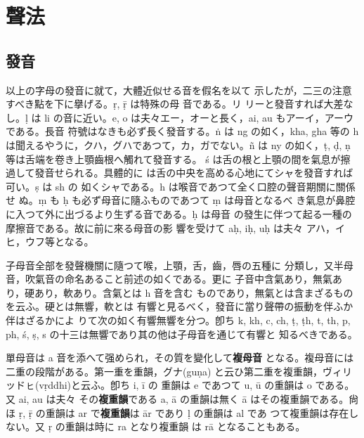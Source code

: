 \chapter{聲法}
\label{cha:pronunciation}

\section{發音}
\numberParagraph
以上の字母の發音に就て，大體近似せる音を假名を以て
示したが，二三の注意すべき點を下に擧げる。ṛ, ṝ は特殊の母
音である。リ リーと發音すれば大差なし。ḷ は li の音に近い。e,
o は夫々エー，オーと長く，ai, au もアーイ，アーウである。長音
符號はなきも必ず長く發音する。ṅ は ng の如く，kha, gha
等の h は聞えるやうに，クハ，グハであつて，カ，ガでない。ñ は
ny の如く，ṭ, ḍ, ṇ 等は舌端を卷き上顎齒根へ觸れて發音する。
ś は舌の根と上顎の間を氣息が擦過して發音せられる。具體的に
は舌の中央を高める心地にてシャを發音すれば可い。ṣ は sh の
如くシャである。h は喉音であつて全く口腔の聲音期關に關係せ
ぬ。ṃ も ḥ も必ず母音に隨ふものであつて ṃ は母音となるべ
き氣息が鼻腔に入つて外に出づるより生ずる音である。ḥ は母音
の發生に伴つて起る一種の摩擦音である。故に前に來る母音の影
響を受けて aḥ, iḥ, uḥ は夫々 アハ，イヒ，ウフ等となる。

\numberParagraph
子母音全部を發聲機關に隨つて喉，上顎，舌，齒，唇の五種に
分類し，又半母音，吹氣音の命名あること前述の如くである。更に
子音中含氣あり，無氣あり，硬あり，軟あり。含氣とは h 音を含む
ものであり，無氣とは含まざるものを云ふ。硬とは無響，軟とは
有響と見るべく，發音に當り聲帶の振動を伴ふか伴はざるかによ
りて次の如く有響無響を分つ。卽ち k, kh, c, ch, ṭ, ṭh, t, th, p,
ph, ś, ṣ, s の十三は無響であり其の他は子母音を通じて有響と
知るべきである。

\numberParagraph \label{np:9}
單母音は a 音を添へて强められ，その質を變化して\textbf{複母音}
となる。複母音には二重の段階がある。第一重を重韻，グナ(guṇa)
と云ひ第二重を複重韻，ヴィリッドㇶ(vṛddhi)と云ふ。卽ち i, ī の
重韻は e であつて u, ū の重韻は o である。又 ai, au は夫々
その\textbf{複重韻}である a, ā の重韻は無く ā はその複重韻である。尙
ほ ṛ, ṝ の重韻は ar で\textbf{複重韻}は ār であり ḷ の重韻は al であ
つて複重韻は存在しない。又 ṛ の重韻は時に ra となり複重韻
は rā となることもある。

\begin{center}
\end{center}

